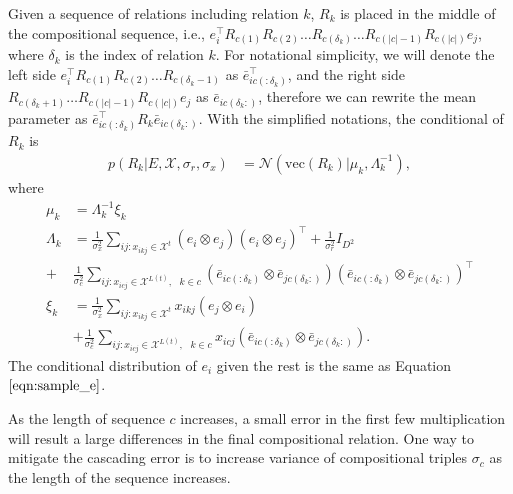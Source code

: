 Given a sequence of relations including relation $k$, $R_k$ is placed in the middle of the compositional 
sequence, i.e., $e_i^\top R_{c(1)}R_{c(2)} \dots R_{c(\delta_k)} \dots R_{c(|c|-1)}R_{c(|c|)} e_j$, where $
\delta_k$ is the index of relation $k$. For notational simplicity, we will denote the left side $e_i^\top R_{c(1)}
R_{c(2)} \dots R_{c(\delta_k -1)}$ as $\bar{e}_{ic(:\delta_k)}^\top$, and the right side $R_{c(\delta_k + 1)} \dots 
R_{c(|c|-1)}R_{c(|c|)} e_j$ as $\bar{e}_{ic(\delta_k:)}$, therefore we can rewrite the mean parameter as $
\bar{e}_{ic(:\delta_k)}^\top R_{k} \bar{e}_{ic(\delta_k:)}$. With the simplified notations, the conditional of $R_k$ 
is
\begin{align}
p(R_k|E, \mathcal{X}, \sigma_r, \sigma_x)  &= \mathcal{N}(\text{vec}(R_k) | \mu_k, \Lambda_k^{-1}),
\end{align}
where
\begin{align*}
\mu_k &= \Lambda_k^{-1}\xi_k \\
\Lambda_k &= \frac{1}{\sigma_x^2} \sum_{ij:x_{ikj} \in \mathcal{X}^{t}} (e_i \otimes e_j)(e_i \otimes e_j)^\top + 
\frac{1}{\sigma_r^2} {I}_{D^2} \\
+ &\frac{1}{\sigma_c^2} \sum_{ij:x_{icj} \in \mathcal{X}^{L(t)}, \text{ }k \in c} (\bar{e}_{ic(:\delta_k)} \otimes 
\bar{e}_{jc(\delta_k:)})(\bar{e}_{ic(:\delta_k)} \otimes \bar{e}_{jc(\delta_k:)} )^\top \\
\xi_k &= \frac{1}{\sigma_x^2} \sum_{ij:x_{ikj} \in \mathcal{X}^{t}} x_{ikj} (e_{j} \otimes e_{i}) \\
& + \frac{1}{\sigma_c^2} \sum_{ij:x_{icj} \in \mathcal{X}^{L(t)}, \text{ }k\in c} x_{icj} (\bar{e}_{ic(:\delta_k)}  
\otimes \bar{e}_{jc(\delta_k:)}).
\end{align*}
The conditional distribution of $e_i$ given the rest is the same as Equation $\ref{eqn:sample_e}$. 

As the length of sequence $c$ increases, a small error in the first few multiplication will result a large 
differences in the final compositional relation. One way to mitigate the cascading error is to increase variance 
of compositional triples $\sigma_c$ as the length of the sequence increases.

